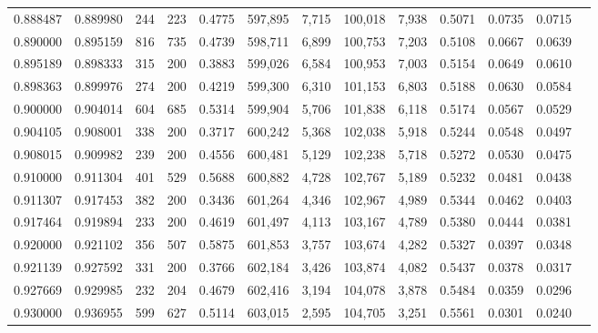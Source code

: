 \begin{tabular}{rrrrrrrrrrrrr}
0.888487 & 0.889980 &   244 & 223 &                                     0.4775 & 597,895 &   7,715 & 100,018 &   7,938 & 0.5071 & 0.0735 & 0.0715 \\
0.890000 & 0.895159 &   816 & 735 &                                     0.4739 & 598,711 &   6,899 & 100,753 &   7,203 & 0.5108 & 0.0667 & 0.0639 \\
0.895189 & 0.898333 &   315 & 200 &                                     0.3883 & 599,026 &   6,584 & 100,953 &   7,003 & 0.5154 & 0.0649 & 0.0610 \\
0.898363 & 0.899976 &   274 & 200 &                                     0.4219 & 599,300 &   6,310 & 101,153 &   6,803 & 0.5188 & 0.0630 & 0.0584 \\
0.900000 & 0.904014 &   604 & 685 &                                     0.5314 & 599,904 &   5,706 & 101,838 &   6,118 & 0.5174 & 0.0567 & 0.0529 \\
0.904105 & 0.908001 &   338 & 200 &                                     0.3717 & 600,242 &   5,368 & 102,038 &   5,918 & 0.5244 & 0.0548 & 0.0497 \\
0.908015 & 0.909982 &   239 & 200 &                                     0.4556 & 600,481 &   5,129 & 102,238 &   5,718 & 0.5272 & 0.0530 & 0.0475 \\
0.910000 & 0.911304 &   401 & 529 &                                     0.5688 & 600,882 &   4,728 & 102,767 &   5,189 & 0.5232 & 0.0481 & 0.0438 \\
0.911307 & 0.917453 &   382 & 200 &                                     0.3436 & 601,264 &   4,346 & 102,967 &   4,989 & 0.5344 & 0.0462 & 0.0403 \\
0.917464 & 0.919894 &   233 & 200 &                                     0.4619 & 601,497 &   4,113 & 103,167 &   4,789 & 0.5380 & 0.0444 & 0.0381 \\
0.920000 & 0.921102 &   356 & 507 &                                     0.5875 & 601,853 &   3,757 & 103,674 &   4,282 & 0.5327 & 0.0397 & 0.0348 \\
0.921139 & 0.927592 &   331 & 200 &                                     0.3766 & 602,184 &   3,426 & 103,874 &   4,082 & 0.5437 & 0.0378 & 0.0317 \\
0.927669 & 0.929985 &   232 & 204 &                                     0.4679 & 602,416 &   3,194 & 104,078 &   3,878 & 0.5484 & 0.0359 & 0.0296 \\
0.930000 & 0.936955 &   599 & 627 &                                     0.5114 & 603,015 &   2,595 & 104,705 &   3,251 & 0.5561 & 0.0301 & 0.0240 \\

\end{tabular}
